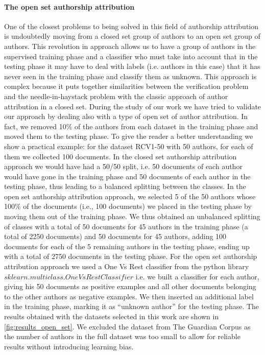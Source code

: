 \paragraph{The open set authorship attribution} One of the closest problems to being solved in this field of authorship attribution is undoubtedly moving from a closed set group of authors to an open set group of authors. This revolution in approach allows us to have a group of authors in the supervised training phase and a classifier who must take into account that in the testing phase it may have to deal with labels (i.e. authors in this case) that it has never seen in the training phase and classify them as unknown. This approach is complex because it puts together similarities between the verification problem and the needle-in-haystack problem with the classic approach of author attribution in a closed set.
During the study of our work we have tried to validate our approach by dealing also with a type of open set of author attribution.
In fact, we removed 10\% of the authors from each dataset in the training phase and moved them to the testing phase.
To give the reader a better understanding we show a practical example: for the dataset RCV1-50 with 50 authors, for each of them we collected 100 documents.
In the closed set authorship attribution approach we would have had a 50/50 split, i.e. 50 documents of each author would have gone in the training phase and 50 documents of each author in the testing phase, thus leading to a balanced splitting between the classes.
In the open set authorship attribution approach, we selected 5 of the 50 authors whose 100\% of the documents (i.e., 100 documents) we placed in the testing phase by moving them out of the training phase. We thus obtained an unbalanced splitting of classes with a total of 50 documents for 45 authors in the training phase (a total of 2250 documents) and 50 documents for 45 authors, adding 100 documents for each of the 5 remaining authors in the testing phase, ending up with a total of 2750 documents in the testing phase.
For the open set authorship attribution approach we used a One Vs Rest classifier from the python library $
sklearn.multiclass.OneVsRestClassifier$ i.e. we built a classifier for each author, giving his 50 documents as positive examples and all other documents belonging to the other authors as negative examples.
We then inserted an additional label in the training phase, marking it as \enquote{unknown author} for the testing phase.
The results obtained with the datasets selected in this work are shown in \autoref{fig:results_open_set}. We excluded the dataset from The Guardian Corpus as the number of authors in the full dataset was too small to allow for reliable results without introducing learning bias.

